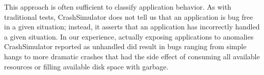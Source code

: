 This approach is often sufficient to classify application behavior.  As
with traditional tests, CrashSimulator does not tell us that an application
is bug free in a given situation; instead, it asserts that an application
has incorrectly handled a given situation.  In our experience, actually
exposing applications to anomalies CrashSimulator reported as unhandled
did result
in bugs ranging from simple hangs to more dramatic crashes that
had the side effect of consuming all available resources or filling
available disk space with garbage.
